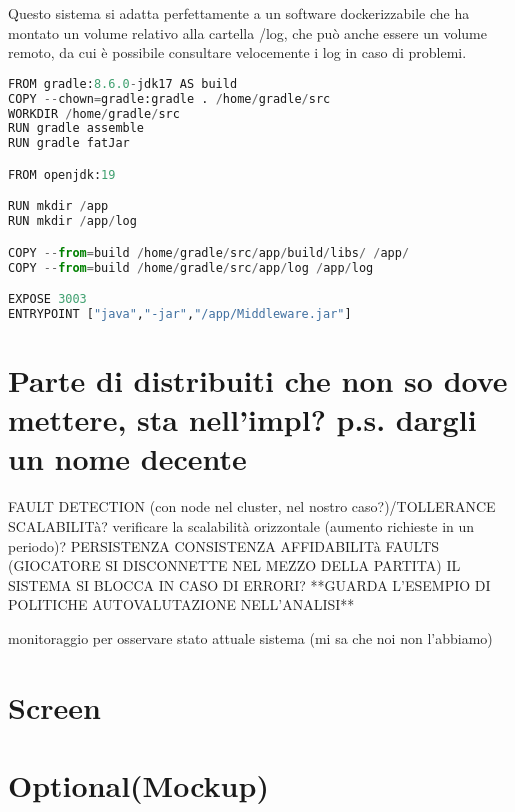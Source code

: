 \vspace{1cm}

Questo sistema si adatta perfettamente a un software dockerizzabile che ha montato un volume relativo alla cartella /log, che può anche essere un volume remoto, da cui è possibile consultare velocemente i log in caso di problemi.

\begin{lstlisting}[language=Python, caption={Volume di log nel dockerfile l.13 da montare successivamente}, label=list:dockerfile_log]
FROM gradle:8.6.0-jdk17 AS build
COPY --chown=gradle:gradle . /home/gradle/src
WORKDIR /home/gradle/src
RUN gradle assemble
RUN gradle fatJar 

FROM openjdk:19

RUN mkdir /app
RUN mkdir /app/log

COPY --from=build /home/gradle/src/app/build/libs/ /app/
COPY --from=build /home/gradle/src/app/log /app/log

EXPOSE 3003
ENTRYPOINT ["java","-jar","/app/Middleware.jar"]
\end{lstlisting}

\section{Parte di distribuiti che non so dove mettere, sta nell'impl? p.s. dargli un nome decente}
FAULT DETECTION (con node nel cluster, nel nostro caso?)/TOLLERANCE
SCALABILITà?
verificare la scalabilità orizzontale (aumento richieste in un periodo)?
PERSISTENZA
CONSISTENZA
AFFIDABILITà
FAULTS (GIOCATORE SI DISCONNETTE NEL MEZZO DELLA PARTITA)
IL SISTEMA SI BLOCCA IN CASO DI ERRORI?
**GUARDA L'ESEMPIO DI POLITICHE AUTOVALUTAZIONE NELL'ANALISI**

monitoraggio per osservare stato attuale sistema (mi sa che noi non l'abbiamo)
\section{Screen}
\section{Optional(Mockup)}

